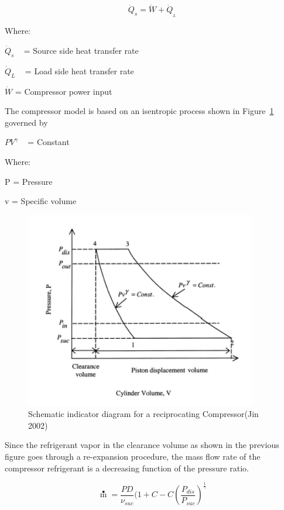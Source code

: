 \begin{equation}
{\dot Q_s} = \dot W + {\dot Q_{_L}}
\end{equation}

Where:

\({\dot Q_s}\) ~ = Source side heat transfer rate

\({\dot Q_L}\) ~ = Load side heat transfer rate

\(\dot W\) = Compressor power input

The compressor model is based on an isentropic process shown in Figure~\ref{fig:schematic-indicator-diagram-for-a} governed by

\(P{V^\gamma }\) ~ = Constant

Where:

P = Pressure

v = Specific volume

\begin{figure}[hbtp] %
\centering
\includegraphics[width=0.9\textwidth, height=0.9\textheight, keepaspectratio=true]{media/image5296.png}
\caption{Schematic indicator diagram for a reciprocating Compressor(Jin 2002) \protect \label{fig:schematic-indicator-diagram-for-a}}
\end{figure}

Since the refrigerant vapor in the clearance volume as shown in the previous figure goes through a re-expansion procedure, the mass flow rate of the compressor refrigerant is a decreasing function of the pressure ratio.

\begin{equation}
\mathop m\limits^ \bullet   = \frac{{PD}}{{\nu {}_{suc}}}(1 + C - C{(\frac{{P{}_{dis}}}{{P{}_{suc}}})^{\frac{1}{\gamma }}}
\end{equation}

